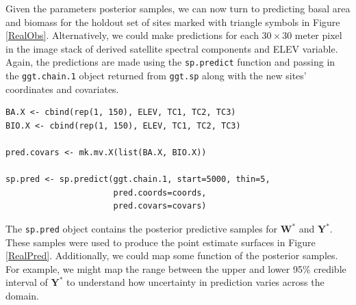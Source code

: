 \documentclass[a4paper]{article}
\newcommand{\bW}{\textbf{W}}
\newcommand{\bY}{\textbf{Y}}
\let\code=\texttt
\begin{document}
Given the parameters posterior samples, we can now turn to predicting basal area and biomass for the holdout set of sites marked with triangle symbols in Figure \ref{RealObs}.  Alternatively, we could make predictions for each $30\times 30$ meter pixel in the image stack of derived satellite spectral components and ELEV variable.  Again, the predictions are made using the \code{sp.predict} function and passing in the \code{ggt.chain.1} object returned from \code{ggt.sp} along with the new sites' coordinates and covariates.
\begin{verbatim}
BA.X <- cbind(rep(1, 150), ELEV, TC1, TC2, TC3)
BIO.X <- cbind(rep(1, 150), ELEV, TC1, TC2, TC3)

pred.covars <- mk.mv.X(list(BA.X, BIO.X))

sp.pred <- sp.predict(ggt.chain.1, start=5000, thin=5,
                      pred.coords=coords,
                      pred.covars=covars)
\end{verbatim}
The \code{sp.pred} object contains the posterior predictive samples for $\bW^{\ast}$ and $\bY^{\ast}$.  These samples were used to produce the point estimate surfaces in Figure \ref{RealPred}.  Additionally, we could map some function of the posterior samples.  For example, we might map the range between the upper and lower 95\% credible interval of $\bY^{\ast}$ to understand how uncertainty in prediction varies across the domain.
\end{document}
